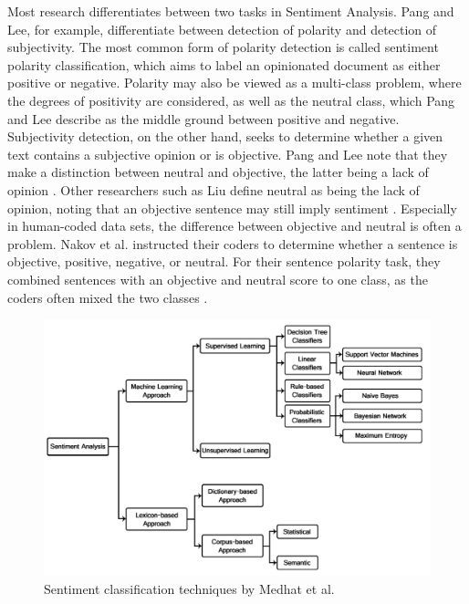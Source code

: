 Most research differentiates between two tasks in Sentiment Analysis. Pang and Lee, for example, differentiate between detection of polarity and detection of subjectivity. The most common form of polarity detection is called sentiment polarity classification, which aims to label an opinionated document as either positive or negative. Polarity may also be viewed as a multi-class problem, where the degrees of positivity are considered, as well as the neutral class, which Pang and Lee describe as the middle ground between positive and negative. Subjectivity detection, on the other hand, seeks to determine whether a given text contains a subjective opinion or is objective. Pang and Lee note that they make a distinction between neutral and objective, the latter being a lack of opinion \cite{DBLP:journals/ftir/PangL07}. Other researchers such as Liu define neutral as being the lack of opinion, noting that an objective sentence may still imply sentiment \cite{liu_2015}. Especially in human-coded data sets, the difference between objective and neutral is often a problem. Nakov et al. instructed their coders to determine whether a sentence is objective, positive, negative, or neutral. For their sentence polarity task, they combined sentences with an objective and neutral score to one class, as the coders often mixed the two classes \cite{nakov-etal-2013-semeval}.

\begin{figure}
    \centering
    \includegraphics[scale=0.3]{Images/classification_techniques.png}
    \caption{Sentiment classification techniques by Medhat et al. \cite{MEDHAT20141093}}
    \label{fig:classifiers}
\end{figure}


